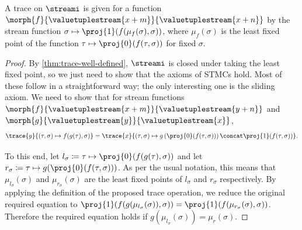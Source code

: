 \documentclass{lmcs}
\begin{document}
\begin{thm}
    A trace on \(\streami\) is given for a function \(
    \morph{f}{\valuetuplestream{x+m}}{\valuetuplestream{x+n}}
    \) by the stream function \(
    \sigma \mapsto \proj{1}(f(\mu_f(\sigma), \sigma))
    \), where \(\mu_f(\sigma)\) is the least fixed point of the function \(
    \tau \mapsto \proj{0}\mleft(f(\tau,\sigma)\mright)
    \) for fixed \(\sigma\).
\end{thm}
\begin{proof}
    By \autoref{thm:trace-well-defined}, \(\streami\) is closed under taking the
    least fixed point, so we just need to show that the axioms of STMCs hold.
    Most of these follow in a straightforward way; the only interesting one is
    the sliding axiom.
    We need to show that for stream functions \(
    \morph{f}{\valuetuplestream{x+m}}{\valuetuplestream{y+n}}
    \) and \(
    \morph{g}{\valuetuplestream{y}}{\valuetuplestream{x}}
    \), \[
        \trace{y}{(\tau, \sigma) \mapsto f(g(\tau), \sigma)}
        =
        \trace{x}{
            (\tau, \sigma)
            \mapsto
            g\left(
            \proj{0}\mleft(f(\tau, \sigma)\mright)
            \right)
            \concat
            \proj{1}\mleft(f(\tau, \sigma)\mright)
        }.
    \]

    To this end, let
    \(
    l_\sigma \coloneqq \tau \mapsto \proj{0}(f(g(\tau), \sigma))
    \)
    and let
    \(
    r_\sigma \coloneqq \tau \mapsto g(\proj{0}(f(\tau, \sigma)))
    \).
    As per the usual notation, this means that \(\mu_{l_\sigma}(\sigma)\) and
    \(\mu_{r_\sigma}(\sigma)\) are the least fixed points of \(l_\sigma\) and
    \(r_\sigma\) respectively.
    By applying the definition of the proposed trace operation, we reduce the
    original required equation to
    \(
    \proj{1}(f(g(\mu_{l_\sigma}(\sigma)), \sigma))
    =
    \proj{1}\mleft(f(\mu_{r_\sigma}(\sigma), \sigma)\mright)
    \).
    Therefore the required equation holds if
    \(
    g(\mu_{l_\sigma}(\sigma))
    =
    \mu_r(\sigma)
    \).


\end{proof}
\end{document}
